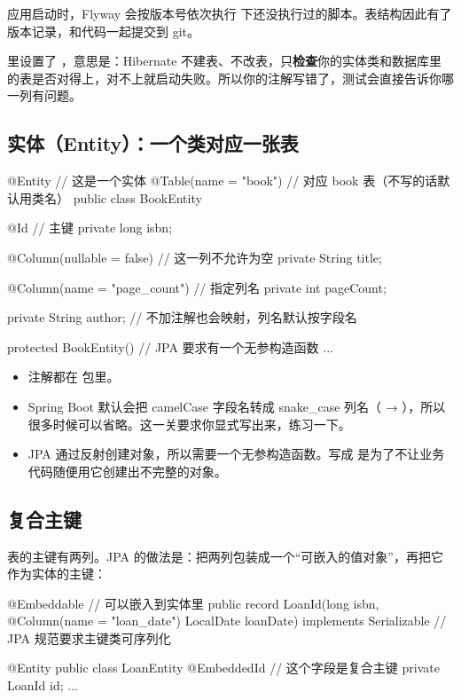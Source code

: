 应用启动时，Flyway 会按版本号依次执行  下还没执行过的脚本。表结构因此有了版本记录，和代码一起提交到 git。

 里设置了 ，意思是：Hibernate 不建表、不改表，只\textbf{检查}你的实体类和数据库里的表是否对得上，对不上就启动失败。所以你的注解写错了，测试会直接告诉你哪一列有问题。

\subsection{实体（Entity）：一个类对应一张表}

\begin{java}
@Entity                               // 这是一个实体
@Table(name = "book")                 // 对应 book 表（不写的话默认用类名）
public class BookEntity {

    @Id                               // 主键
    private long isbn;

    @Column(nullable = false)         // 这一列不允许为空
    private String title;

    @Column(name = "page_count")      // 指定列名
    private int pageCount;

    private String author;            // 不加注解也会映射，列名默认按字段名

    protected BookEntity() {}         // JPA 要求有一个无参构造函数
    ...
}
\end{java}

\begin{itemize}
  \item 注解都在  包里。
  \item Spring Boot 默认会把 camelCase 字段名转成 snake\_case 列名（ → ），所以  很多时候可以省略。这一关要求你显式写出来，练习一下。
  \item JPA 通过反射创建对象，所以需要一个无参构造函数。写成  是为了不让业务代码随便用它创建出不完整的对象。
\end{itemize}

\subsection{复合主键}

 表的主键有两列。JPA 的做法是：把两列包装成一个“可嵌入的值对象”，再把它作为实体的主键：

\begin{java}
@Embeddable                                          // 可以嵌入到实体里
public record LoanId(long isbn, @Column(name = "loan_date") LocalDate loanDate)
        implements Serializable {}                   // JPA 规范要求主键类可序列化

@Entity
public class LoanEntity {
    @EmbeddedId                                      // 这个字段是复合主键
    private LoanId id;
    ...
}
\end{java}


